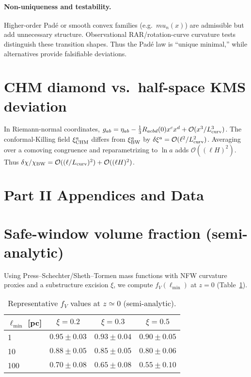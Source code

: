 \documentclass[aps,prd,onecolumn,superscriptaddress,nofootinbib]{revtex4-2}
\def\mu{mu}%
\begin{document}
\paragraph{Non-uniqueness and testability.}
Higher-order Padé or smooth convex families (e.g.\ \(\mu_n(x)\))
are admissible but add unnecessary structure. Observational
RAR/rotation-curve curvature tests distinguish these transition
shapes. Thus the Padé law is “unique minimal,” while alternatives
provide falsifiable deviations.

\section{CHM diamond vs.\ half-space KMS deviation}
\label{app:chm-kms-estimate}
In Riemann-normal coordinates,
\(g_{ab}=\eta_{ab}-\tfrac{1}{3}R_{acbd}(0)x^c x^d+\mathcal O(x^3/L_{\rm curv}^3)\).
The conformal-Killing field \(\xi^a_{\rm CHM}\) differs from \(\xi^a_{\rm BW}\) by \(\delta\xi^a=\mathcal O(\ell^2/L_{\rm curv}^2)\).
Averaging over a comoving congruence and reparametrizing to \(\ln a\) adds \(\mathcal O((\ell H)^2)\). Thus
\(\delta\chi/\chi_{\rm BW}=\mathcal O((\ell/L_{\rm curv})^2)+\mathcal O((\ell H)^2)\).

\section*{Part II Appendices and Data}

\section{Safe-window volume fraction (semi-analytic)}
\label{app:fv}
Using Press–Schechter/Sheth–Tormen mass functions with NFW curvature proxies and a substructure excision \(\xi\), we compute \(f_V(\ell_{\min})\) at \(z\!=\!0\) (Table~\ref{tab:fV}).

\begin{table}[b]
\centering
\caption{Representative \(f_V\) values at \(z\simeq 0\) (semi-analytic).}
\label{tab:fV}
\begin{tabular}{lccc}
\toprule
\(\ell_{\min}\) [pc] & \(\xi=0.2\) & \(\xi=0.3\) & \(\xi=0.5\) \\
\midrule
1   & \(0.95\pm0.03\) & \(0.93\pm0.04\) & \(0.90\pm0.05\) \\
10  & \(0.88\pm0.05\) & \(0.85\pm0.05\) & \(0.80\pm0.06\) \\
100 & \(0.70\pm0.08\) & \(0.65\pm0.08\) & \(0.55\pm0.10\) \\
\bottomrule
\end{tabular}
\end{table}
\end{document}
